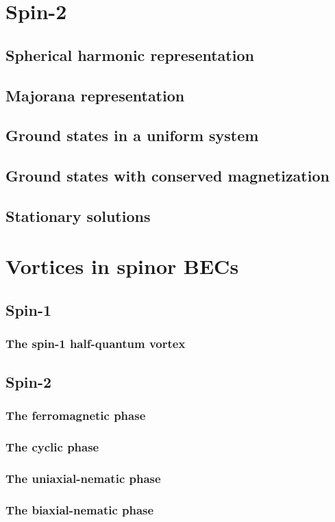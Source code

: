 \section{Spin-2}

\subsection{Spherical harmonic representation}

\subsection{Majorana representation}

\subsection{Ground states in a uniform system}

\subsection{Ground states with conserved magnetization}

\subsection{Stationary solutions}

\section{Vortices in spinor BECs}

\subsection{Spin-1}
\subsubsection{The spin-1 half-quantum vortex}

\subsection{Spin-2}

\subsubsection{The ferromagnetic phase}
\subsubsection{The cyclic phase}
\subsubsection{The uniaxial-nematic phase}
\subsubsection{The biaxial-nematic phase}
